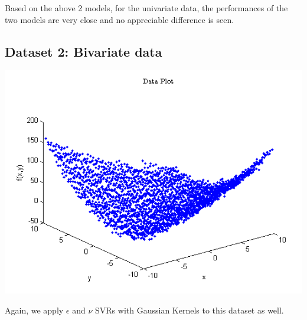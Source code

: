 \documentclass{article}
\begin{document}
Based on the above 2 models, for the univariate data, the performances of the two models are very close and no appreciable difference is seen.
\subsection{Dataset 2: Bivariate data}
\begin{center}
\includegraphics[scale=1]{Regression/bivar/bivar}
\end{center}
Again, we apply $\epsilon$ and $\nu$ SVRs with Gaussian Kernels to this dataset as well.
\end{document}
